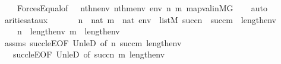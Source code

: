 \begin{isabellebody}
\ \ \ \ Forces{\isacharunderscore}{\kern0pt}Equal{\isacharbrackleft}{\kern0pt}of\ {\isacharunderscore}{\kern0pt}\ \ {\isachardoublequoteopen}nth{\isacharparenleft}{\kern0pt}n{\isacharcomma}{\kern0pt}env{\isacharparenright}{\kern0pt}{\isachardoublequoteclose}\ {\isachardoublequoteopen}nth{\isacharparenleft}{\kern0pt}m{\isacharcomma}{\kern0pt}env{\isacharparenright}{\kern0pt}{\isachardoublequoteclose}\ env\ n\ m{\isacharbrackright}{\kern0pt}\ map{\isacharunderscore}{\kern0pt}val{\isacharunderscore}{\kern0pt}in{\isacharunderscore}{\kern0pt}MG\isanewline
\ \ \isamarkupfalse%
\ {\isacharparenleft}{\kern0pt}auto{\isacharparenright}{\kern0pt}%
\endisatagproof
{\isafoldproof}%
%
\isadelimproof
\isanewline
%
\endisadelimproof
\isanewline
{}\isamarkupfalse%
\ arities{\isacharunderscore}{\kern0pt}at{\isacharunderscore}{\kern0pt}aux{\isacharcolon}{\kern0pt}\isanewline
\ \ \isanewline
\ \ \ \ {\isachardoublequoteopen}n\ {\isasymin}\ nat{\isachardoublequoteclose}\ {\isachardoublequoteopen}m\ {\isasymin}\ nat{\isachardoublequoteclose}\ {\isachardoublequoteopen}env\ {\isasymin}\ list{\isacharparenleft}{\kern0pt}M{\isacharparenright}{\kern0pt}{\isachardoublequoteclose}\ {\isachardoublequoteopen}succ{\isacharparenleft}{\kern0pt}n{\isacharparenright}{\kern0pt}\ {\isasymunion}\ succ{\isacharparenleft}{\kern0pt}m{\isacharparenright}{\kern0pt}\ {\isasymle}\ length{\isacharparenleft}{\kern0pt}env{\isacharparenright}{\kern0pt}{\isachardoublequoteclose}\isanewline
\ \ \isanewline
\ \ \ \ {\isachardoublequoteopen}n\ {\isacharless}{\kern0pt}\ length{\isacharparenleft}{\kern0pt}env{\isacharparenright}{\kern0pt}{\isachardoublequoteclose}\ {\isachardoublequoteopen}m\ {\isacharless}{\kern0pt}\ length{\isacharparenleft}{\kern0pt}env{\isacharparenright}{\kern0pt}{\isachardoublequoteclose}\isanewline
%
\isadelimproof
\ \ %
\endisadelimproof
%
\isatagproof
{}\isamarkupfalse%
\ assms\ succ{\isacharunderscore}{\kern0pt}leE{\isacharbrackleft}{\kern0pt}OF\ Un{\isacharunderscore}{\kern0pt}leD{}{\isacharcomma}{\kern0pt}\ of\ n\ {\isachardoublequoteopen}succ{\isacharparenleft}{\kern0pt}m{\isacharparenright}{\kern0pt}{\isachardoublequoteclose}\ {\isachardoublequoteopen}length{\isacharparenleft}{\kern0pt}env{\isacharparenright}{\kern0pt}{\isachardoublequoteclose}{\isacharbrackright}{\kern0pt}\ \isanewline
\ \ \ succ{\isacharunderscore}{\kern0pt}leE{\isacharbrackleft}{\kern0pt}OF\ Un{\isacharunderscore}{\kern0pt}leD{}{\isacharcomma}{\kern0pt}\ of\ {\isachardoublequoteopen}succ{\isacharparenleft}{\kern0pt}n{\isacharparenright}{\kern0pt}{\isachardoublequoteclose}\ m\ {\isachardoublequoteopen}length{\isacharparenleft}{\kern0pt}env{\isacharparenright}{\kern0pt}{\isachardoublequoteclose}{\isacharbrackright}{\kern0pt}\ \isamarkupfalse%

\end{isabellebody}
